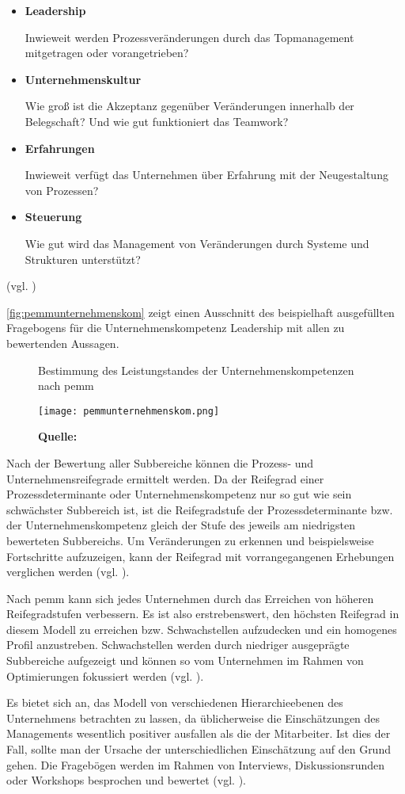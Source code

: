 \begin{itemize}
  \item \textbf{Leadership} \par Inwieweit werden Prozessveränderungen durch das Topmanagement mitgetragen oder vorangetrieben?
	\item \textbf{Unternehmenskultur} \par Wie groß ist die Akzeptanz gegenüber Veränderungen innerhalb der Belegschaft? Und wie gut funktioniert das Teamwork?
	\item \textbf{Erfahrungen} \par Inwieweit verfügt das Unternehmen über Erfahrung mit der Neugestaltung von Prozessen?
	\item \textbf{Steuerung} \par Wie gut wird das Management von Veränderungen durch Systeme und Strukturen unterstützt?
\end{itemize}

(vgl. \cite[S.43]{Bensiek2013})

\autoref{fig:pemmunternehmenskom} zeigt einen Ausschnitt des beispielhaft ausgefüllten Fragebogens für die Unternehmenskompetenz Leadership mit allen zu bewertenden Aussagen.

\begin{figure}[H]
  \centering
  \caption{Bestimmung des Leistungstandes der Unternehmenskompetenzen nach \acs{pemm}}
  \texttt{[image: pemmunternehmenskom.png]}
  \caption*{\footnotesize{\textbf{Quelle:} \cite[S.42]{Bensiek2013}}}
  \label{fig:pemmunternehmenskom}
\end{figure}

Nach der Bewertung aller Subbereiche können die Prozess- und Unternehmensreifegrade ermittelt werden. Da der Reifegrad einer Prozessdeterminante oder Unternehmenskompetenz nur so gut wie sein schwächster Subbereich ist, ist die Reifegradstufe der Prozessdeterminante bzw. der Unternehmenskompetenz gleich der Stufe des jeweils am niedrigsten bewerteten Subbereichs. Um Veränderungen zu erkennen und beispielsweise Fortschritte aufzuzeigen, kann der Reifegrad mit vorrangegangenen Erhebungen verglichen werden (vgl. \cite[S.43f]{Bensiek2013}).\par
Nach \acs{pemm} kann sich jedes Unternehmen durch das Erreichen von höheren Reifegradstufen verbessern. Es ist also erstrebenswert, den höchsten Reifegrad in diesem Modell zu erreichen bzw. Schwachstellen aufzudecken und ein homogenes Profil anzustreben. Schwachstellen werden durch niedriger ausgeprägte Subbereiche aufgezeigt und können so vom Unternehmen im Rahmen von Optimierungen fokussiert werden (vgl. \cite[S.44]{Bensiek2013}).\par
Es bietet sich an, das Modell von verschiedenen Hierarchieebenen des Unternehmens betrachten zu lassen, da üblicherweise die Einschätzungen des Managements wesentlich positiver ausfallen als die der Mitarbeiter. Ist dies der Fall, sollte man der Ursache der unterschiedlichen Einschätzung auf den Grund gehen. Die Fragebögen werden im Rahmen von Interviews, Diskussionsrunden oder Workshops besprochen und bewertet (vgl. \cite[S.43]{Bensiek2013}).

